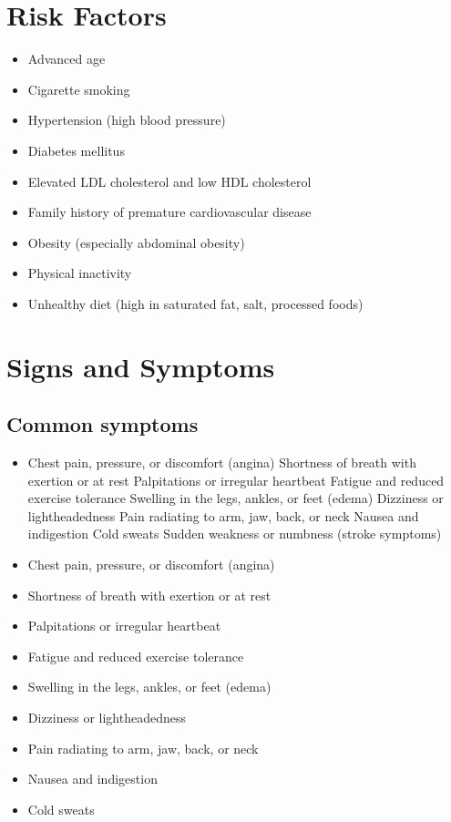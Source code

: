 \section{Risk Factors}

\begin{itemize}[noitemsep]
  \item Advanced age
  \item Cigarette smoking
  \item Hypertension (high blood pressure)
  \item Diabetes mellitus
  \item Elevated LDL cholesterol and low HDL cholesterol
  \item Family history of premature cardiovascular disease
  \item Obesity (especially abdominal obesity)
  \item Physical inactivity
  \item Unhealthy diet (high in saturated fat, salt, processed foods)
\end{itemize}
\section{Signs and Symptoms}

\subsection{Common symptoms}
\begin{itemize}[noitemsep]
  \item Chest pain, pressure, or discomfort (angina) Shortness of breath with exertion or at rest Palpitations or irregular heartbeat Fatigue and reduced exercise tolerance Swelling in the legs, ankles, or feet (edema) Dizziness or lightheadedness Pain radiating to arm, jaw, back, or neck Nausea and indigestion Cold sweats Sudden weakness or numbness (stroke symptoms)
  \item Chest pain, pressure, or discomfort (angina)
  \item Shortness of breath with exertion or at rest
  \item Palpitations or irregular heartbeat
  \item Fatigue and reduced exercise tolerance
  \item Swelling in the legs, ankles, or feet (edema)
  \item Dizziness or lightheadedness
  \item Pain radiating to arm, jaw, back, or neck
  \item Nausea and indigestion
  \item Cold sweats
\end{itemize}

